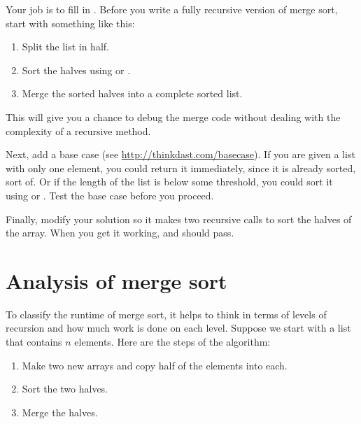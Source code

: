 \documentclass[12pt]{book}
\theoremstyle{exercise}
\begin{document}

Your job is to fill in . Before you write a fully
recursive version of merge sort, start with something like this:

\begin{enumerate}

\item
  Split the list in half.

\item
  Sort the halves using  or
  .

\item
  Merge the sorted halves into a complete sorted list.

\end{enumerate}

This will give you a chance to debug the merge code without dealing with
the complexity of a recursive method.


Next, add a base case (see
\url{http://thinkdast.com/basecase}). If you are
given a list with only one element, you could return it immediately,
since it is already sorted, sort of. Or if the length of the list is
below some threshold, you could sort it using 
or . Test the base case before you proceed.

Finally, modify your solution so it makes two recursive calls to sort
the halves of the array. When you get it working, 
and  should pass.


\section{Analysis of merge sort}
\label{analysis-of-merge-sort}


To classify the runtime of merge sort, it helps to think in terms of
levels of recursion and how much work is done on each level. Suppose
we start with a list that contains $n$ elements. Here are the steps of
the algorithm:

\begin{enumerate}

\item
  Make two new arrays and copy half of the elements into each.

\item
  Sort the two halves.

\item
  Merge the halves.

\end{enumerate}
\end{document}
